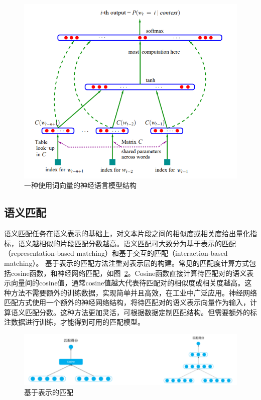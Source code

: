 \begin{figure}[h!]
\centering
\includegraphics[scale=1]{img/chapter_nlp/guang_represent_1.png}
\caption{一种使用词向量的神经语言模型结构}
\label{fig:neural_language_model}
\end{figure}

\subsection{语义匹配}
语义匹配任务在语义表示的基础上，对文本片段之间的相似度或相关度给出量化指标，语义越相似的片段匹配分数越高。语义匹配可大致分为基于表示的匹配（representation-based matching）\cite{ feng2015applying}和基于交互的匹配（interaction-based matching）\cite{ zhou2018multi, luspatio}。
基于表示的匹配方法注重对表示层的构建。常见的匹配度计算方式包括cosine函数，和神经网络匹配，如图~\ref{fig:representation_based_matching}。Cosine函数直接计算待匹配对的语义表示向量间的cosine值，通常cosine值越大代表待匹配对的相似度或相关度越高。这种方法不需要额外的训练数据，实现简单并且高效，在工业中广泛应用。神经网络匹配方式使用一个额外的神经网络结构，将待匹配对的语义表示向量作为输入，计算语义匹配分数。这种方法更加灵活，可根据数据定制匹配结构。但需要额外的标注数据进行训练，才能得到可用的匹配模型。

\begin{figure}[h!]
\centering
\includegraphics[scale=0.8]{img/chapter_nlp/guang_match_1.png}
\caption{基于表示的匹配}
\label{fig:representation_based_matching}
\end{figure}

